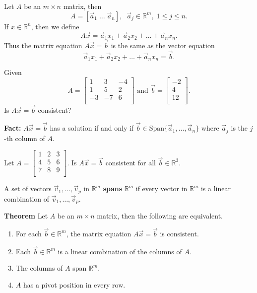 \documentclass[12pt,letterpaper]{article}
\begin{document}
\newpage

Let $A$ be an $m \times n$ matrix, then $$A = [ \vec{a}_1\; \dots \; \vec{a}_n], \; \; \vec{a}_j \in \mathbb{R}^m,\; 1\leq j \leq n.$$  
If $x \in \mathbb{R}^n$, then we define $$A \vec{x} = \vec{a}_1 x_1 + \vec{a}_2 x_2 +\dots + \vec{a}_n x_n.$$ Thus the matrix equation $A\vec{x} =\vec{b}$ is the same as the vector equation $$\vec{a}_1 x_1 + \vec{a}_2 x_2 +\dots + \vec{a}_n x_n=\vec{b}.$$


\begin{enumerate}

\Problem Given $$A=\begin{bmatrix}
1 & 3 & -4\\
1 & 5 & 2\\
-3 & -7 & 6\\
\end{bmatrix}\text{  and }\vec{b}=\begin{bmatrix} -2\\ 4 \\ 12\\ \end{bmatrix}.$$ Is $A\vec{x} =\vec{b}$ consistent?

\newpage

{\bf Fact:} $A\vec{x} =\vec{b}$ has a solution if and only if $\vec{b} \in \text{Span}\{\vec{a}_1,\dots, \vec{a}_n\}$ where $\vec{a}_j$ is the $j$-th column of $A$.

\Problem Let $A=\begin{bmatrix} 1 & 2 & 3 \\ 4 & 5 & 6\\ 7 & 8 & 9\\ \end{bmatrix}$. Is $A\vec{x} =\vec{b}$ consistent for all $\vec{b} \in \mathbb{R}^3$.

\vfill

\begin{defn}
A set of vectors $\vec{v}_1, \dots, \vec{v}_p$ in $\mathbb{R}^m$ {\bf spans} $\mathbb{R}^m$ if every vector in $\mathbb{R}^m$ is a linear combination of $\vec{v}_1, \dots, \vec{v}_p$.
\end{defn}

\newpage

{\bf Theorem} Let $A$ be an $m \times n$ matrix, then the following are equivalent.
\begin{enumerate}
\item For each $\vec{b} \in \mathbb{R}^m$, the matrix equation $A \vec{x} =\vec{b}$ is consistent.
\item Each $\vec{b} \in \mathbb{R}^m$ is a linear combination of the columns of $A$.
\item The columns of $A$ span $\mathbb{R}^m$.
\item $A$ has a pivot position in every row.
\end{enumerate}


\end{enumerate}
\end{document}
